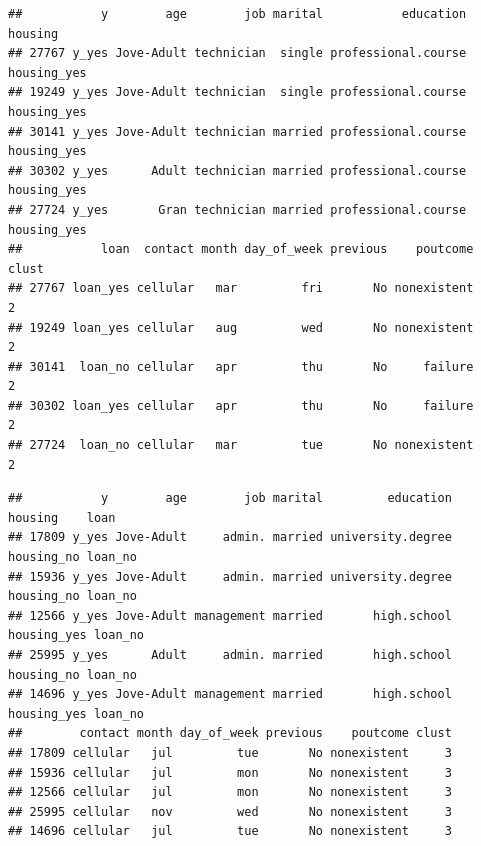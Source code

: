 \documentclass[
]{article}
\newenvironment{Shaded}{\begin{snugshade}}{\end{snugshade}}
\newcommand{\DecValTok}[1]{\textcolor[rgb]{0.00,0.00,0.81}{#1}}
\newcommand{\FunctionTok}[1]{\textcolor[rgb]{0.00,0.00,0.00}{#1}}
\newcommand{\NormalTok}[1]{#1}
\newcommand{\SpecialCharTok}[1]{\textcolor[rgb]{0.00,0.00,0.00}{#1}}
\begin{document}
\begin{verbatim}
##           y        age        job marital           education     housing
## 27767 y_yes Jove-Adult technician  single professional.course housing_yes
## 19249 y_yes Jove-Adult technician  single professional.course housing_yes
## 30141 y_yes Jove-Adult technician married professional.course housing_yes
## 30302 y_yes      Adult technician married professional.course housing_yes
## 27724 y_yes       Gran technician married professional.course housing_yes
##           loan  contact month day_of_week previous    poutcome clust
## 27767 loan_yes cellular   mar         fri       No nonexistent     2
## 19249 loan_yes cellular   aug         wed       No nonexistent     2
## 30141  loan_no cellular   apr         thu       No     failure     2
## 30302 loan_yes cellular   apr         thu       No     failure     2
## 27724  loan_no cellular   mar         tue       No nonexistent     2
\end{verbatim}

\begin{Shaded}
\end{Shaded}

\begin{verbatim}
##           y        age        job marital         education     housing    loan
## 17809 y_yes Jove-Adult     admin. married university.degree  housing_no loan_no
## 15936 y_yes Jove-Adult     admin. married university.degree  housing_no loan_no
## 12566 y_yes Jove-Adult management married       high.school housing_yes loan_no
## 25995 y_yes      Adult     admin. married       high.school  housing_no loan_no
## 14696 y_yes Jove-Adult management married       high.school housing_yes loan_no
##        contact month day_of_week previous    poutcome clust
## 17809 cellular   jul         tue       No nonexistent     3
## 15936 cellular   jul         mon       No nonexistent     3
## 12566 cellular   jul         mon       No nonexistent     3
## 25995 cellular   nov         wed       No nonexistent     3
## 14696 cellular   jul         tue       No nonexistent     3
\end{verbatim}
\end{document}
